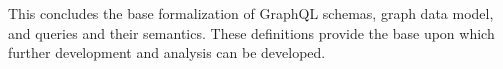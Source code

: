 

This concludes the base formalization of GraphQL schemas, graph data model, and queries and their semantics.  These definitions provide the base upon which further development and analysis can be developed.

